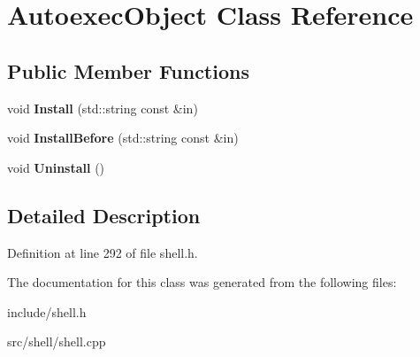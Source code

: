 \hypertarget{classAutoexecObject}{\section{Autoexec\-Object Class Reference}
\label{classAutoexecObject}
}
\subsection*{Public Member Functions}
\begin{DoxyCompactItemize}
\item 
\hypertarget{classAutoexecObject_a30b975e4cf89783c6e56025c60479ca1}{void {\bfseries Install} (std\-::string const \&in)}\label{classAutoexecObject_a30b975e4cf89783c6e56025c60479ca1}

\item 
\hypertarget{classAutoexecObject_a006d09ad8eef5bc34e1d72778a96cce6}{void {\bfseries Install\-Before} (std\-::string const \&in)}\label{classAutoexecObject_a006d09ad8eef5bc34e1d72778a96cce6}

\item 
\hypertarget{classAutoexecObject_a62d93cd9fdbf05b70f05410ae7bb73df}{void {\bfseries Uninstall} ()}\label{classAutoexecObject_a62d93cd9fdbf05b70f05410ae7bb73df}

\end{DoxyCompactItemize}


\subsection{Detailed Description}


Definition at line 292 of file shell.\-h.



The documentation for this class was generated from the following files\-:\begin{DoxyCompactItemize}
\item 
include/shell.\-h\item 
src/shell/shell.\-cpp\end{DoxyCompactItemize}
